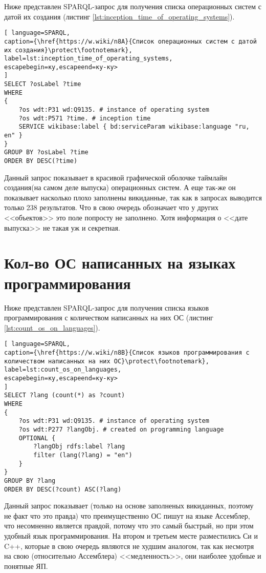 Ниже представлен SPARQL-запрос для получения списка операционных систем с датой их создания (листинг \ref{lst:inception_time_of_operating_systems}).
\begin{lstlisting}[ language=SPARQL, 
caption={\href{https://w.wiki/n8A}{Список операционных систем с датой их создания}\protect\footnotemark},
label=lst:inception_time_of_operating_systems, 
escapebegin=ку,escapeend=ку-ку>
]
SELECT ?osLabel ?time
WHERE
{
	?os wdt:P31 wd:Q9135. # instance of operating system
	?os wdt:P571 ?time. # inception time
	SERVICE wikibase:label { bd:serviceParam wikibase:language "ru, en" }
}
GROUP BY ?osLabel ?time
ORDER BY DESC(?time)
\end{lstlisting}

Данный запрос показывает в красивой графической оболочке таймлайн создания(на самом деле выпуска) операционных систем. А еще так-же он показывает насколько плохо заполнены викиданные, так как в запросах выводится только 238 результатов. Что в свою очередь обозначает что у других <<объектов>> это поле попросту не заполнено. Хотя информация о <<дате выпуска>> не такая уж и секретная.

\section{Кол-во ОС написанных на языках программирования}
Ниже представлен SPARQL-запрос для получения списка языков программирования с количеством написанных на них ОС (листинг \ref{lst:count_os_on_languages}).

\begin{lstlisting}[ language=SPARQL, 
caption={\href{https://w.wiki/n8B}{Список языков программирования с количеством написанных на них ОС}\protect\footnotemark},
label=lst:count_os_on_languages, 
escapebegin=ку,escapeend=ку-ку>
]
SELECT ?lang (count(*) as ?count)
WHERE 
{
	?os wdt:P31 wd:Q9135. # instance of operating system
	?os wdt:P277 ?langObj. # created on programming language
	OPTIONAL {
		?langObj rdfs:label ?lang
		filter (lang(?lang) = "en")
	}
}
GROUP BY ?lang
ORDER BY DESC(?count) ASC(?lang)
\end{lstlisting}

Данный запрос показывает (только на основе заполненых викиданных, поэтому не факт что это правда) что преимущественно ОС пишут на языке Ассемблер, что несомненно является правдой, потому что это самый быстрый, но при этом удобный язык программирования. На втором и третьем месте разместились Си и C++, которые в свою очередь являются не худшим аналогом, так как несмотря на свою (относительно Ассемблера) <<медленность>>, они наиболее удобные и понятные ЯП.


